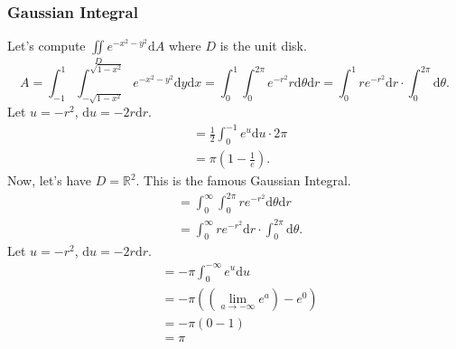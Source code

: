 \subsubsection{Gaussian Integral}
\noindent
Let's compute $\iint\limits_{D}{e^{-x^2-y^2}\mathrm{d}A}$ where $D$ is the unit disk.
\begin{equation*}
	A = \int_{-1}^{1}{\int_{-\sqrt{1 - x^2}}^{\sqrt{1 - x^2}}{e^{-x^2 - y^2}\mathrm{d}y}\mathrm{d}x} = \int_{0}^{1}{\int_{0}^{2\pi}{e^{-r^2}r\mathrm{d}\theta}\mathrm{d}r} = \int_{0}^{1}{re^{-r^2}\mathrm{d}r} \cdot \int_{0}^{2\pi}{\mathrm{d}\theta}.
\end{equation*}
Let $u = -r^2$, $\mathrm{d} u =-2r\mathrm{d}r$.\\
\begin{align*}
	&= \frac{1}{2}\int_{0}^{-1}{e^u\mathrm{d}u} \cdot 2\pi	\\
	&= \pi\left(1 - \frac{1}{e}\right).
\end{align*}
Now, let's have $D = \mathbb{R}^2$. This is the famous Gaussian Integral.
\begin{align*}
	&= \int_{0}^{\infty}{\int_{0}^{2\pi}{re^{-r^2}\mathrm{d}\theta}\mathrm{d}r} \\
	&= \int_{0}^{\infty}{re^{-r^2}\mathrm{d}r} \cdot \int_{0}^{2\pi}{\mathrm{d}\theta}.
\end{align*}
Let $ u =-r^2$, $\mathrm{d}u = -2r\mathrm{d}r$.
\begin{align*}
	&= -\pi\int_{0}^{-\infty}{e^{u}\mathrm{d}u} \\
	&= -\pi\left(\left(\lim_{a\to -\infty}{e^{a}}\right) - e^0\right) \\
	&= -\pi\left(0 - 1\right) \\
	&= \pi
\end{align*}
